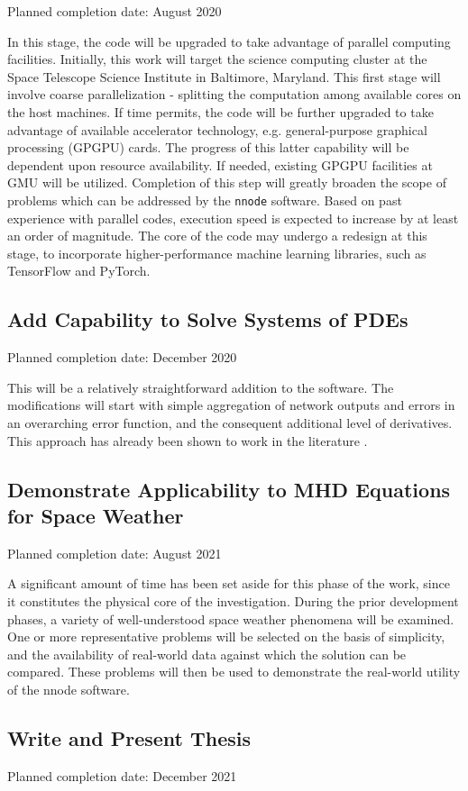 \documentclass{article}
\begin{document}
Planned completion date: August 2020

In this stage, the code will be upgraded to take advantage of parallel computing facilities. Initially, this work will target the science computing cluster at the Space Telescope Science Institute in Baltimore, Maryland. This first stage will involve coarse parallelization - splitting the computation among available cores on the host machines. If time permits, the code will be further upgraded to take advantage of available accelerator technology, e.g. general-purpose graphical processing (GPGPU) cards. The progress of this latter capability will be dependent upon resource availability. If needed, existing GPGPU facilities at GMU will be utilized. Completion of this step will greatly broaden the scope of problems which can be addressed by the \texttt{nnode} software. Based on past experience with parallel codes, execution speed is expected to increase by at least an order of magnitude. The core of the code may undergo a redesign at this stage, to incorporate higher-performance machine learning libraries, such as TensorFlow and PyTorch.

\subsection{Add Capability to Solve Systems of PDEs}

Planned completion date: December 2020

This will be a relatively straightforward addition to the software. The modifications will start with simple aggregation of network outputs and errors in an overarching error function, and the consequent additional level of derivatives. This approach has already been shown to work in the literature \cite{Lagaris1998}.

\subsection{Demonstrate Applicability to MHD Equations for Space Weather}

Planned completion date: August 2021

A significant amount of time has been set aside for this phase of the work, since it constitutes the physical core of the investigation. During the prior development phases, a variety of well-understood space weather phenomena will be examined. One or more representative problems will be selected on the basis of simplicity, and the availability of real-world data against which the solution can be compared. These problems will then be used to demonstrate the real-world utility of the nnode software.

\subsection{Write and Present Thesis}

Planned completion date: December 2021


\medskip


\end{document}
